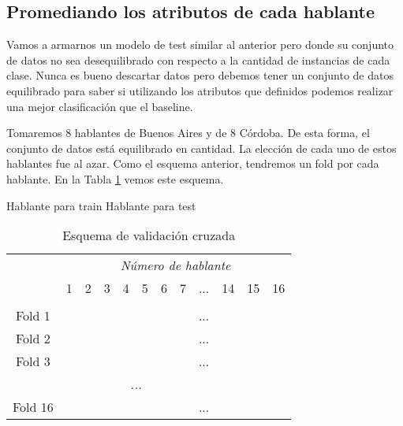 \subsection{Promediando los atributos de cada hablante}
\label{prom_los_atributos_de_cada_hablante}

Vamos a armarnos un modelo de test similar al anterior pero donde su conjunto de datos no sea desequilibrado con respecto a la cantidad de instancias de cada clase. Nunca es bueno descartar datos pero debemos tener un conjunto de datos equilibrado para saber si utilizando los atributos que definidos podemos realizar una mejor clasificación que el baseline.

Tomaremos 8 hablantes de Buenos Aires y de 8 Córdoba. De esta forma, el conjunto de datos está equilibrado en cantidad. La elección de cada uno de estos hablantes fue al azar. Como el esquema anterior, tendremos un fold por cada hablante. En la Tabla \ref{PAH_esq_cv} vemos este esquema.

\begin{center}
	\mycirc[blue] Hablante para train \mycirc[red] Hablante para test
\end{center}

\begin{table}[H]
	\centering
	\begin{tabular}{cccccccccccc}
		& \multicolumn{11}{c}{\textit{Número de hablante}} \\
		& 1 & 2 & 3 & 4 & 5 & 6 & 7 & ... & 14 & 15 & 16 \\
		\hline \\
		Fold 1 &\mycirc[red] & \mycirc[blue] & \mycirc[blue]  & \mycirc[blue]  & \mycirc[blue]  & \mycirc[blue]  & \mycirc[blue] & ... & \mycirc[blue] & \mycirc[blue] & \mycirc[blue]  \\
		
		Fold 2 &\mycirc[blue] & \mycirc[red] & \mycirc[blue]  & \mycirc[blue]  & \mycirc[blue]  & \mycirc[blue]  & \mycirc[blue] & ... & \mycirc[blue] & \mycirc[blue] & \mycirc[blue]  \\
		
		Fold 3 &\mycirc[blue] & \mycirc[blue] & \mycirc[red]  & \mycirc[blue]  & \mycirc[blue]  & \mycirc[blue]  & \mycirc[blue] & ... & \mycirc[blue] & \mycirc[blue] & \mycirc[blue]  \\
		
		\multicolumn{11}{c}{\textit{...}}	\\
		
		Fold 16 &\mycirc[blue] & \mycirc[blue] & \mycirc[blue]  & \mycirc[blue]  & \mycirc[blue]  & \mycirc[blue]  & \mycirc[blue] & ... & \mycirc[blue] & \mycirc[blue] & \mycirc[red]   \\
		
	\end{tabular}
	\caption{Esquema de validación cruzada}
	\label{PAH_esq_cv}
\end{table}

